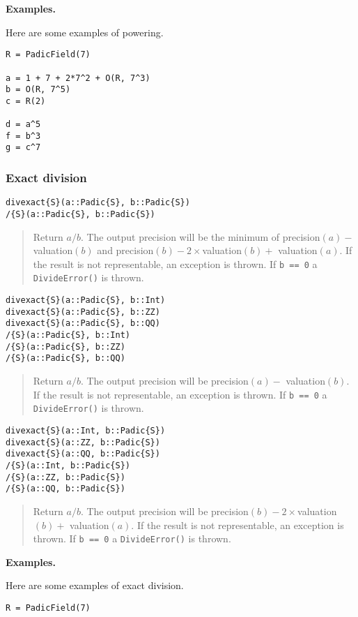 \documentclass[a4paper,10pt]{article}
\newcommand{\code}{\lstinline}
\newcommand{\desc}[1]{\vspace{-3mm}\begin{quote}#1\end{quote}}
\begin{document}
{{{\textbf{Examples.}

Here are some examples of powering.

\begin{lstlisting}
R = PadicField(7)

a = 1 + 7 + 2*7^2 + O(R, 7^3)
b = O(R, 7^5)
c = R(2)

d = a^5
f = b^3
g = c^7
\end{lstlisting}

\subsubsection{Exact division}

\begin{lstlisting}
divexact{S}(a::Padic{S}, b::Padic{S})
/{S}(a::Padic{S}, b::Padic{S})
\end{lstlisting}

\desc{Return $a/b$. The output precision will be the minimum of 
precision$(a) -$ valuation$(b)$ and precision$(b) - 2\times$valuation$(b) +$
valuation$(a)$. If the result is not representable, an exception is
thrown. If \code{b == 0} a \code{DivideError()} is thrown.}

\begin{lstlisting}
divexact{S}(a::Padic{S}, b::Int)
divexact{S}(a::Padic{S}, b::ZZ)
divexact{S}(a::Padic{S}, b::QQ)
/{S}(a::Padic{S}, b::Int)
/{S}(a::Padic{S}, b::ZZ)
/{S}(a::Padic{S}, b::QQ)
\end{lstlisting}

\desc{Return $a/b$. The output precision will be precision$(a) -$ 
valuation$(b)$. If the result is not representable, an exception is
thrown. If \code{b == 0} a \code{DivideError()} is thrown.}

\begin{lstlisting}
divexact{S}(a::Int, b::Padic{S})
divexact{S}(a::ZZ, b::Padic{S})
divexact{S}(a::QQ, b::Padic{S})
/{S}(a::Int, b::Padic{S})
/{S}(a::ZZ, b::Padic{S})
/{S}(a::QQ, b::Padic{S})
\end{lstlisting}

\desc{Return $a/b$. The output precision will be 
precision$(b) - 2\times$valuation$(b) +$ valuation$(a)$. If the result is not
representable, an exception is thrown. If \code{b == 0} a \code{DivideError()}
is thrown.}

\textbf{Examples.}

Here are some examples of exact division.

\begin{lstlisting}
R = PadicField(7)


\end{lstlisting}}}}
\end{document}
